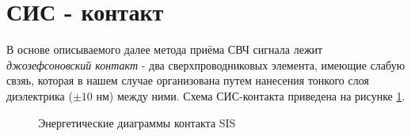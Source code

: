\documentclass[12pt,a4paper]{article}
\begin{document}
\:

\newpage

\section{СИС - контакт}

В основе описываемого далее метода приёма СВЧ сигнала лежит \textit{джозефсоновский контакт} - два сверхпроводниковых элемента, имеющие слабую свзяь, которая в нашем случае организована путем нанесения тонкого слоя диэлектрика ($\pm 10$ нм) между ними. Схема СИС-контакта приведена на рисунке \ref{sis}.

    \begin{figure}[h]
            \begin{minipage}[h]{0.55\linewidth}
            \end{minipage}
        \hfill
            \begin{minipage}[h]{0.55\linewidth}
            \end{minipage}
        \caption{Энергетические диаграммы контакта SIS}
        \label{sis}
    \end{figure}
\end{document}
